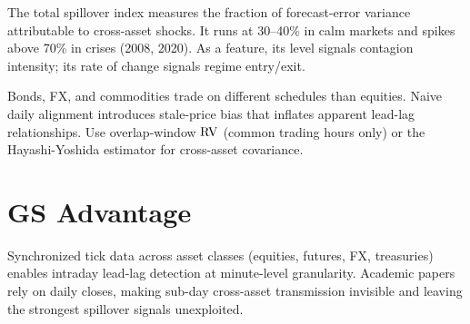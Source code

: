 \begin{keyidea}
The \citet{DieboldYilmaz2012} total spillover index measures the fraction of forecast-error variance attributable to cross-asset shocks.
It runs at 30--40\% in calm markets and spikes above 70\% in crises (2008, 2020).
As a feature, its level signals contagion intensity; its rate of change signals regime entry/exit.
\end{keyidea}

\begin{warning}
Bonds, FX, and commodities trade on different schedules than equities.
Naive daily alignment introduces stale-price bias that inflates apparent lead-lag relationships.
Use overlap-window $\operatorname{RV}$ (common trading hours only) or the Hayashi-Yoshida estimator for cross-asset covariance.
\end{warning}


\section{GS Advantage}
\label{sec:gs-advantage}

Synchronized tick data across asset classes (equities, futures, FX, treasuries) enables intraday lead-lag detection at minute-level granularity.
Academic papers rely on daily closes, making sub-day cross-asset transmission invisible and leaving the strongest spillover signals unexploited.
